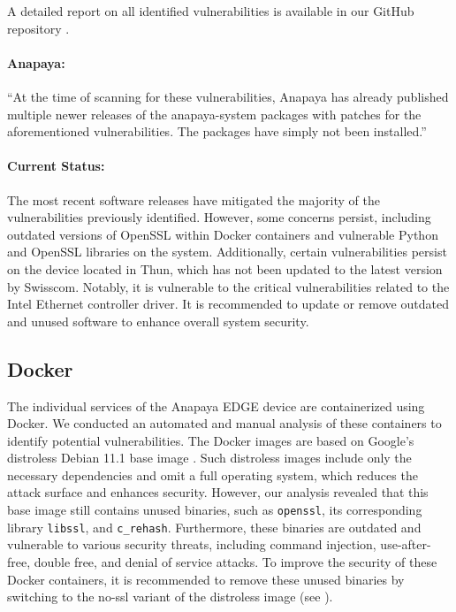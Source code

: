 A detailed report on all identified vulnerabilities is available in our GitHub repository \cite{gitHubMseewerMasterThesis}.
\newpage
\begin{boxH}
\paragraph{Anapaya:}
``At the time of scanning for these vulnerabilities, Anapaya has already published multiple newer releases of the anapaya-system packages with patches for the aforementioned vulnerabilities. The packages have simply not been installed.''
\end{boxH}

\paragraph{Current Status:}
The most recent software releases have mitigated the majority of the vulnerabilities previously identified.
However, some concerns persist, including outdated versions of OpenSSL within Docker containers and vulnerable Python and OpenSSL libraries on the system.
Additionally, certain vulnerabilities persist on the device located in Thun, which has not been updated to the latest version by Swisscom.
Notably, it is vulnerable to the critical vulnerabilities related to the Intel Ethernet controller driver.
It is recommended to update or remove outdated and unused software to enhance overall system security.

\subsection{Docker}
\label{sec:docker}

The individual services of the Anapaya EDGE device are containerized using Docker.
We conducted an automated and manual analysis of these containers to identify potential vulnerabilities.
The Docker images are based on Google's distroless Debian 11.1 base image \cite{githubGitHubGoogleContainerToolsdistroless}.
Such distroless images include only the necessary dependencies and omit a full operating system, which reduces the attack surface and enhances security.
However, our analysis revealed that this base image still contains unused binaries, such as \texttt{openssl}, its corresponding library \texttt{libssl}, and \texttt{c\_rehash}.
Furthermore, these binaries are outdated and vulnerable to various security threats, including command injection, use-after-free, double free, and denial of service attacks.
To improve the security of these Docker containers, it is recommended to remove these unused binaries by switching to the no-ssl variant of the distroless image (see \cite{githubGitHubGoogleContainerToolsdistroless}).


